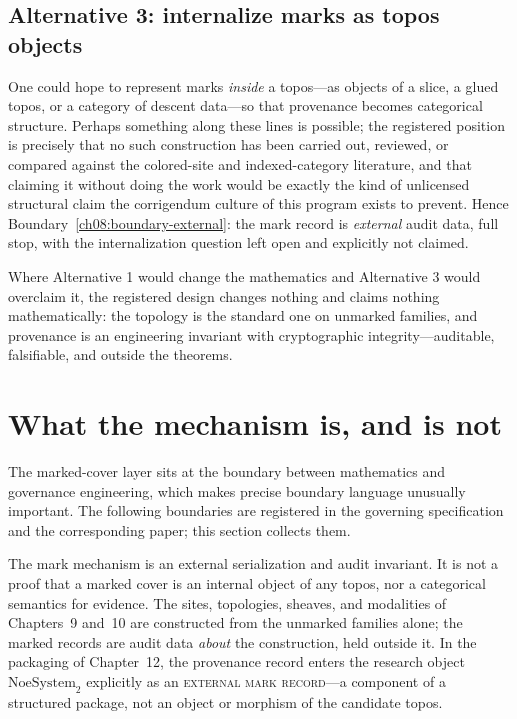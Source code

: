 \subsection{Alternative 3: internalize marks as topos objects}
One could hope to represent marks \emph{inside} a topos---as objects of a slice, a glued topos, or a category of descent data---so that provenance becomes categorical structure. Perhaps something along these lines is possible; the registered position is precisely that no such construction has been carried out, reviewed, or compared against the colored-site and indexed-category literature, and that claiming it without doing the work would be exactly the kind of unlicensed structural claim the corrigendum culture of this program exists to prevent. Hence Boundary~\ref{ch08:boundary-external}: the mark record is \emph{external} audit data, full stop, with the internalization question left open and explicitly not claimed.

\begin{remark}\label{ch08:rem-design-sentence}
Where Alternative 1 would change the mathematics and Alternative 3 would overclaim it, the registered design changes nothing and claims nothing mathematically: the topology is the standard one on unmarked families, and provenance is an engineering invariant with cryptographic integrity---auditable, falsifiable, and outside the theorems.
\end{remark}

\section{What the mechanism is, and is not}\label{ch08:sec-boundaries}

The marked-cover layer sits at the boundary between mathematics and governance engineering, which makes precise boundary language unusually important. The following boundaries are registered in the governing specification and the corresponding paper; this section collects them.

\begin{boundary}\label{ch08:boundary-external}
The mark mechanism is an external serialization and audit invariant. It is not a proof that a marked cover is an internal object of any topos, nor a categorical semantics for evidence. The sites, topologies, sheaves, and modalities of Chapters~9 and~10 are constructed from the unmarked families alone; the marked records are audit data \emph{about} the construction, held outside it. In the packaging of Chapter~12, the provenance record enters the research object \(\mathrm{NoeSystem}_2\) explicitly as an \textsc{external mark record}---a component of a structured package, not an object or morphism of the candidate topos.
\end{boundary}

